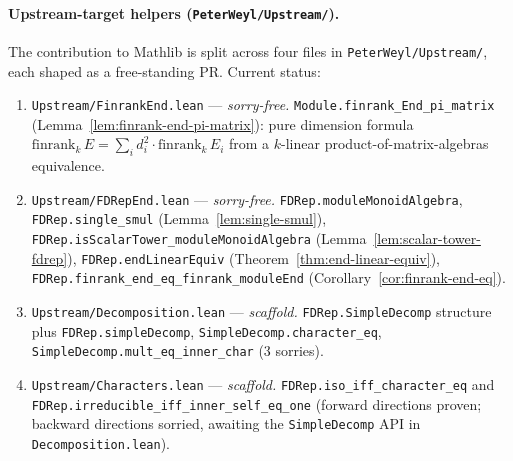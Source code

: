 \paragraph{Upstream-target helpers (\texttt{PeterWeyl/Upstream/}).}
The contribution to Mathlib is split across four files in
\texttt{PeterWeyl/Upstream/}, each shaped as a free-standing PR.  Current status:
\begin{enumerate}
  \item \texttt{Upstream/FinrankEnd.lean} — \emph{sorry-free.}
    \texttt{Module.finrank\_End\_pi\_matrix}
    (Lemma~\ref{lem:finrank-end-pi-matrix}): pure dimension formula
    $\mathrm{finrank}_k\,E = \sum_i d_i^2\cdot\mathrm{finrank}_k\,E_i$ from a
    $k$-linear product-of-matrix-algebras equivalence.
  \item \texttt{Upstream/FDRepEnd.lean} — \emph{sorry-free.}
    \texttt{FDRep.moduleMonoidAlgebra},
    \texttt{FDRep.single\_smul} (Lemma~\ref{lem:single-smul}),
    \texttt{FDRep.isScalarTower\_moduleMonoidAlgebra}
    (Lemma~\ref{lem:scalar-tower-fdrep}),
    \texttt{FDRep.endLinearEquiv}
    (Theorem~\ref{thm:end-linear-equiv}),
    \texttt{FDRep.finrank\_end\_eq\_finrank\_moduleEnd}
    (Corollary~\ref{cor:finrank-end-eq}).
  \item \texttt{Upstream/Decomposition.lean} — \emph{scaffold.}
    \texttt{FDRep.SimpleDecomp} structure plus
    \texttt{FDRep.simpleDecomp},
    \texttt{SimpleDecomp.character\_eq},
    \texttt{SimpleDecomp.mult\_eq\_inner\_char} (3 sorries).
  \item \texttt{Upstream/Characters.lean} — \emph{scaffold.}
    \texttt{FDRep.iso\_iff\_character\_eq} and
    \texttt{FDRep.irreducible\_iff\_inner\_self\_eq\_one} (forward
    directions proven; backward directions sorried, awaiting the
    \texttt{SimpleDecomp} API in \texttt{Decomposition.lean}).
\end{enumerate}

